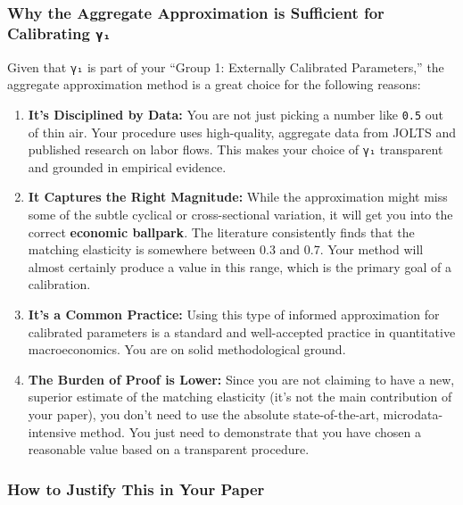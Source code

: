 \documentclass[
  11pt,
  letterpaper,
  DIV=11,
  numbers=noendperiod]{scrartcl}
\begin{document}
\subsubsection{\texorpdfstring{\textbf{Why the Aggregate Approximation
is Sufficient for Calibrating
\texttt{γ₁}}}{Why the Aggregate Approximation is Sufficient for Calibrating γ₁}}\label{why-the-aggregate-approximation-is-sufficient-for-calibrating-ux3b3ux2081}

Given that \texttt{γ₁} is part of your ``Group 1: Externally Calibrated
Parameters,'' the aggregate approximation method is a great choice for
the following reasons:

\begin{enumerate}
\def\labelenumi{\arabic{enumi}.}
\item
  \textbf{It's Disciplined by Data:} You are not just picking a number
  like \texttt{0.5} out of thin air. Your procedure uses high-quality,
  aggregate data from JOLTS and published research on labor flows. This
  makes your choice of \texttt{γ₁} transparent and grounded in empirical
  evidence.
\item
  \textbf{It Captures the Right Magnitude:} While the approximation
  might miss some of the subtle cyclical or cross-sectional variation,
  it will get you into the correct \textbf{economic ballpark}. The
  literature consistently finds that the matching elasticity is
  somewhere between 0.3 and 0.7. Your method will almost certainly
  produce a value in this range, which is the primary goal of a
  calibration.
\item
  \textbf{It's a Common Practice:} Using this type of informed
  approximation for calibrated parameters is a standard and
  well-accepted practice in quantitative macroeconomics. You are on
  solid methodological ground.
\item
  \textbf{The Burden of Proof is Lower:} Since you are not claiming to
  have a new, superior estimate of the matching elasticity (it's not the
  main contribution of your paper), you don't need to use the absolute
  state-of-the-art, microdata-intensive method. You just need to
  demonstrate that you have chosen a reasonable value based on a
  transparent procedure.
\end{enumerate}

\subsubsection{\texorpdfstring{\textbf{How to Justify This in Your
Paper}}{How to Justify This in Your Paper}}\label{how-to-justify-this-in-your-paper}
\end{document}
